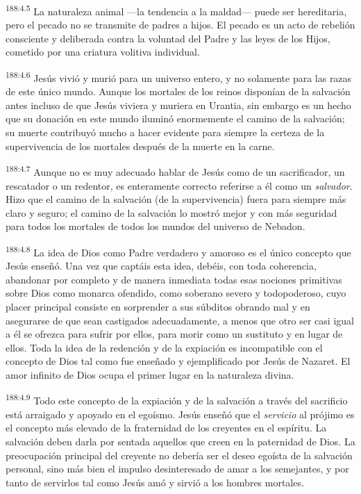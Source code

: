 \par 
\textsuperscript{188:4.5} La naturaleza animal ---la tendencia a la maldad--- puede ser hereditaria, pero el pecado no se transmite de padres a hijos. El pecado es un acto de rebelión consciente y deliberada contra la voluntad del Padre y las leyes de los Hijos, cometido por una criatura volitiva individual.

\par 
\textsuperscript{188:4.6} Jesús vivió y murió para un universo entero, y no solamente para las razas de este único mundo. Aunque los mortales de los reinos disponían de la salvación antes incluso de que Jesús viviera y muriera en Urantia, sin embargo es un hecho que su donación en este mundo iluminó enormemente el camino de la salvación; su muerte contribuyó mucho a hacer evidente para siempre la certeza de la supervivencia de los mortales después de la muerte en la carne.

\par 
\textsuperscript{188:4.7} Aunque no es muy adecuado hablar de Jesús como de un sacrificador, un rescatador o un redentor, es enteramente correcto referirse a él como un \textit{salvador}. Hizo que el camino de la salvación (de la supervivencia) fuera para siempre más claro y seguro; el camino de la salvación lo mostró mejor y con más seguridad para todos los mortales de todos los mundos del universo de Nebadon.

\par 
\textsuperscript{188:4.8} La idea de Dios como Padre verdadero y amoroso es el único concepto que Jesús enseñó. Una vez que captáis esta idea, debéis, con toda coherencia, abandonar por completo y de manera inmediata todas esas nociones primitivas sobre Dios como monarca ofendido, como soberano severo y todopoderoso, cuyo placer principal consiste en sorprender a sus súbditos obrando mal y en asegurarse de que sean castigados adecuadamente, a menos que otro ser casi igual a él se ofrezca para sufrir por ellos, para morir como un sustituto y en lugar de ellos. Toda la idea de la redención y de la expiación es incompatible con el concepto de Dios tal como fue enseñado y ejemplificado por Jesús de Nazaret. El amor infinito de Dios ocupa el primer lugar en la naturaleza divina.

\par 
\textsuperscript{188:4.9} Todo este concepto de la expiación y de la salvación a través del sacrificio está arraigado y apoyado en el egoísmo. Jesús enseñó que el \textit{servicio} al prójimo es el concepto más elevado de la fraternidad de los creyentes en el espíritu. La salvación deben darla por sentada aquellos que creen en la paternidad de Dios. La preocupación principal del creyente no debería ser el deseo egoísta de la salvación personal, sino más bien el impulso desinteresado de amar a los semejantes, y por tanto de servirlos tal como Jesús amó y sirvió a los hombres mortales.

